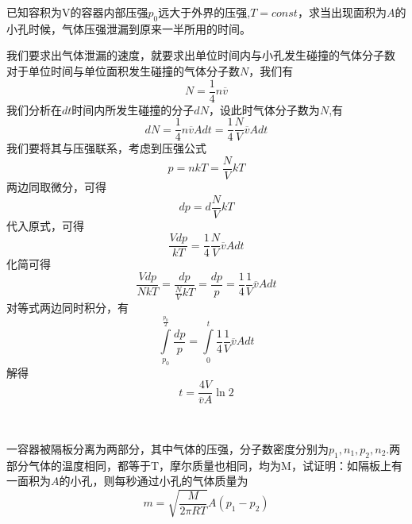 \documentclass[lang=cn,10pt]{elegantbook}
\begin{document}
	\begin{example}
		已知容积为V的容器内部压强$p_{0}$远大于外界的压强,$T=const$，求当出现面积为$A$的小孔时候，气体压强泄漏到原来一半所用的时间。
	\end{example}
	\begin{solution}
		我们要求出气体泄漏的速度，就要求出单位时间内与小孔发生碰撞的气体分子数
		对于单位时间与单位面积发生碰撞的气体分子数$N$，我们有
		\begin{equation*}
			N=\frac{1}{4}n\overline{v}
		\end{equation*}
		我们分析在$dt$时间内所发生碰撞的分子$dN$，设此时气体分子数为$N$,有
		\begin{equation*}
			dN=\frac{1}{4}n\overline{v}Adt=\frac{1}{4}\frac{N}{V}\overline{v}Adt
		\end{equation*}
		我们要将其与压强联系，考虑到压强公式
		\begin{equation*}
			p=nkT=\frac{N}{V}kT
		\end{equation*}
		两边同取微分，可得
		\begin{equation*}
				dp=d\frac{N}{V}kT
		\end{equation*}
		代入原式，可得
		\begin{equation*}
			\frac{Vdp}{kT}=\frac{1}{4}\frac{N}{V}\overline{v}Adt
		\end{equation*}
		化简可得
		\begin{equation*}
			\frac{Vdp}{NkT}=\frac{dp}{\frac{N}{V}kT}=\frac{dp}{p}=\frac{1}{4}\frac{1}{V}\overline{v}Adt
		\end{equation*}
		对等式两边同时积分，有
		\begin{equation*}
			\int\limits_{p_0}^{\frac{p_0}{2}}{}\frac{dp}{p}=\int\limits_0^t{}\frac{1}{4}\frac{1}{V}\overline{v}Adt
		\end{equation*}
		解得
		\begin{equation*}
			t=\frac{4V}{\overline{v}A}\ln2
		\end{equation*}
	\end{solution}
	~\\
	\begin{example}
		一容器被隔板分离为两部分，其中气体的压强，分子数密度分别为$p_{1},n_{1},p_{2},n_{2}$.两部分气体的温度相同，都等于T，摩尔质量也相同，均为M，试证明：如隔板上有一面积为$A$的小孔，则每秒通过小孔的气体质量为
		\begin{equation*}
			m=\sqrt{\frac{M}{2\pi RT}}A\left( p_1-p_2 \right) 
		\end{equation*}
	\end{example}
\end{document}
